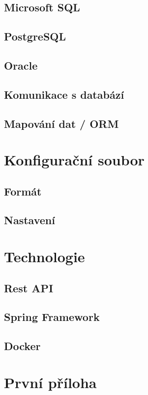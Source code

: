 \documentclass[czech, kiv, ba, he, iso690alph, pdf]{fasthesis}
\begin{document}
\section{Microsoft SQL}
\section{PostgreSQL}
\section{Oracle}
\section{Komunikace s databází}
\section{Mapování dat / ORM}

\chapter{Konfigurační soubor}
\section{Formát}
\section{Nastavení}

\chapter{Technologie}
\section{Rest API}
\section{Spring Framework}
\section{Docker}




\appendix
\chapter{První příloha}
\backmatter
\printbibliography
\backpage
\end{document}
